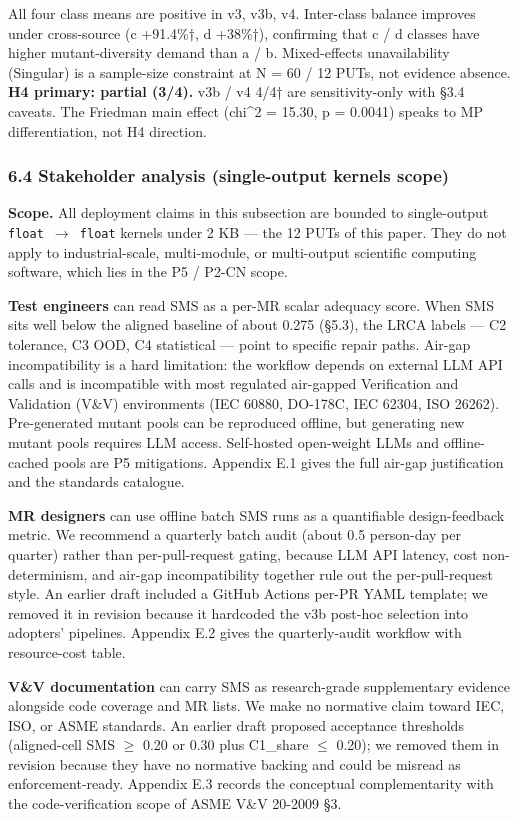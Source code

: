 \documentclass[review,12pt,authoryear]{elsarticle}
\begin{document}
All four class means are positive in v3, v3b, v4. Inter-class balance
improves under cross-source (c +91.4\%†, d +38\%†), confirming that c /
d classes have higher mutant-diversity demand than a / b. Mixed-effects
unavailability (Singular) is a sample-size constraint at N = 60 / 12
PUTs, not evidence absence. \textbf{H4 primary: partial (3/4).} v3b / v4
4/4† are sensitivity-only with §3.4 caveats. The Friedman main effect
(chi\^{}2 = 15.30, p = 0.0041) speaks to MP differentiation, not H4
direction.

\subsubsection{6.4 Stakeholder analysis (single-output kernels
scope)}\label{stakeholder-analysis-single-output-kernels-scope}

\textbf{Scope.} All deployment claims in this subsection are bounded to
single-output \texttt{float\ $\to$\ float} kernels under 2 KB --- the 12
PUTs of this paper. They do not apply to industrial-scale, multi-module,
or multi-output scientific computing software, which lies in the P5 /
P2-CN scope.

\textbf{Test engineers} can read SMS as a per-MR scalar adequacy score.
When SMS sits well below the aligned baseline of about 0.275 (§5.3), the
LRCA labels --- C2 tolerance, C3 OOD, C4 statistical --- point to
specific repair paths. Air-gap incompatibility is a hard limitation: the
workflow depends on external LLM API calls and is incompatible with most
regulated air-gapped Verification and Validation (V\&V) environments
(IEC 60880, DO-178C, IEC 62304, ISO 26262). Pre-generated mutant pools
can be reproduced offline, but generating new mutant pools requires LLM
access. Self-hosted open-weight LLMs and offline-cached pools are P5
mitigations. Appendix E.1 gives the full air-gap justification and the
standards catalogue.

\textbf{MR designers} can use offline batch SMS runs as a quantifiable
design-feedback metric. We recommend a quarterly batch audit (about 0.5
person-day per quarter) rather than per-pull-request gating, because LLM
API latency, cost non-determinism, and air-gap incompatibility together
rule out the per-pull-request style. An earlier draft included a GitHub
Actions per-PR YAML template; we removed it in revision because it
hardcoded the v3b post-hoc selection into adopters' pipelines. Appendix
E.2 gives the quarterly-audit workflow with resource-cost table.

\textbf{V\&V documentation} can carry SMS as research-grade
supplementary evidence alongside code coverage and MR lists. We make no
normative claim toward IEC, ISO, or ASME standards. An earlier draft
proposed acceptance thresholds (aligned-cell SMS $\geq$ 0.20 or 0.30 plus
C1\_share $\leq$ 0.20); we removed them in revision because they have no
normative backing and could be misread as enforcement-ready. Appendix
E.3 records the conceptual complementarity with the code-verification
scope of ASME V\&V 20-2009 §3.
\end{document}
